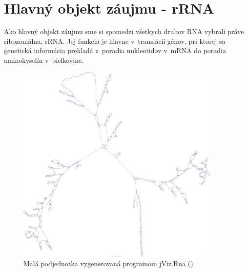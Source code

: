 \section{Hlavný objekt záujmu - rRNA}

Ako hlavný objekt záujmu sme si spomedzi všetkych druhov RNA vybrali práve ribozomálnu, rRNA.
Jej funkcia je hlavne v~translácií génov, pri ktorej sa genetická informácia prekladá
z~poradia nukleotidov v~mRNA do poradia aminokyselín v~bielkovine.

\begin{figure}[H]
  \centering
  \includegraphics[width=0.9\textwidth]{../img/human_jviz}
  \caption{Malá podjednotka vygenerovaná programom jViz.Rna (\citet{JVIZ})}
  \label{obr:human_jviz}
\end{figure}

